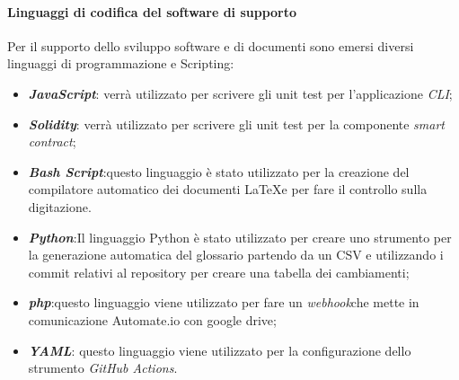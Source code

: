 \paragraph{Linguaggi di codifica del software di supporto}
Per il supporto dello sviluppo software e di documenti sono emersi diversi linguaggi
di programmazione e Scripting:
 \begin{itemize}
   \item \textbf{\textit{JavaScript\glos}}: verrà utilizzato per scrivere gli unit test per l'applicazione \textit{CLI}\glos;
   \item \textbf{\textit{Solidity\glos}}: verrà utilizzato per scrivere gli unit test per la componente \textit{smart contract}\glos;
   \item \textbf{\textit{Bash Script\glos}}:questo linguaggio è stato utilizzato per la creazione del compilatore automatico
   dei documenti \LaTeX e per fare il controllo sulla digitazione.
   \item \textbf{\textit{Python\glos}}:Il linguaggio Python è stato utilizzato per creare uno strumento per la generazione
   automatica del glossario partendo da un CSV e utilizzando i commit relativi
   al repository per creare una tabella dei cambiamenti;
   \item \textbf{\textit{php\glos}}:questo linguaggio viene utilizzato per  fare
   un \textit{webhook}\glo che mette in comunicazione Automate.io con google drive;
   \item \textbf{\textit{YAML\glos}}: questo linguaggio viene utilizzato per la configurazione dello strumento \textit{GitHub Actions\glos}.
 \end{itemize}

